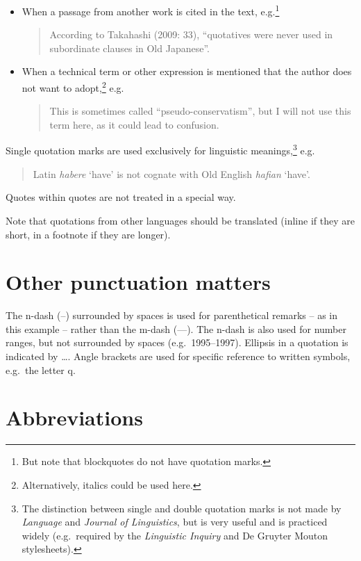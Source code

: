 \documentclass[a4paper]{article}
\newenvironment{gsrexq}{\begin{quote}\color{blue}}{\end{quote}}
\newcommand{\gsrex}[1]{{\color{blue}#1}}
\begin{document}
\begin{itemize}
  \item  When a passage from another work is cited in the text, e.g.\footnote{But note that blockquotes do not have quotation marks.}
    \begin{gsrexq} 
      According to Takahashi (2009: 33), ``quotatives were never used in subordinate clauses in Old Japanese''.
    \end{gsrexq}
  \item When a technical term or other expression is mentioned that the author does not want to adopt,\footnote{Alternatively, italics could be used here.} e.g.
    \begin{gsrexq}
      This is sometimes called ``pseudo-conservatism'', but I will not use this term here, as it could lead to confusion.
    \end{gsrexq}
\end{itemize}

Single quotation marks are used exclusively for
linguistic meanings,\footnote{The distinction between single and double
quotation marks is not made by \textit{Language} and \textit{Journal of Linguistics}, but
is very useful and is practiced widely (e.g.~required by the \textit{Linguistic
Inquiry} and De Gruyter Mouton stylesheets).} e.g.

\begin{gsrexq}
  Latin \textit{habere} `have' is not cognate with Old English \textit{hafian} `have'. 
\end{gsrexq}
Quotes within quotes are
not treated in a special way.

Note that quotations from other languages should be translated (inline
if they are short, in a footnote if they are longer).

\section{Other punctuation matters}\label{sec:other-punctuation-matters}

The n-dash (\gsrex{--}) surrounded by spaces is used for parenthetical remarks
-- as in this example -- rather than the m-dash (\gsrex{---}). The n-dash is
also used for number ranges, but not surrounded by spaces
(e.g.~\gsrex{1995--1997}). Ellipsis in a quotation is indicated by
\gsrex{\ldots}. Angle brackets are used for specific reference to
written symbols, e.g.~\gsrex{the letter q}.

\section{Abbreviations}\label{sec:abbreviations}
\end{document}
